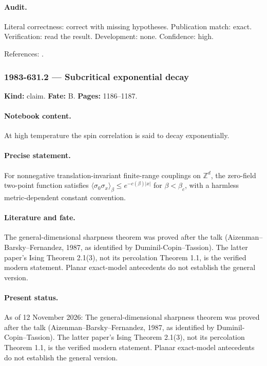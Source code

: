 \paragraph{Audit.} Literal correctness: correct with missing hypotheses. Publication match: exact. Verification: read the result. Development: none. Confidence: high.

\noindent References: \citep{onsager1944crystal}.\par

\subsubsection{1983-631.2 --- Subcritical exponential decay}

\label{item:1983-631.2}

\noindent\textbf{Kind:} claim. \textbf{Fate:} B. \textbf{Pages:} 1186--1187.\par

\paragraph{Notebook content.} At high temperature the spin correlation is said to decay exponentially.

\paragraph{Precise statement.} For nonnegative translation-invariant finite-range couplings on \(\mathbb Z^d\), the zero-field two-point function satisfies \(\langle\sigma_0\sigma_x\rangle_\beta\le e^{-c(\beta)|x|}\) for \(\beta<\beta_c\), with a harmless metric-dependent constant convention.

\paragraph{Literature and fate.} The general-dimensional sharpness theorem was proved after the talk (Aizenman--Barsky--Fernandez, 1987, as identified by Duminil-Copin--Tassion). The latter paper's Ising Theorem 2.1(3), not its percolation Theorem 1.1, is the verified modern statement. Planar exact-model antecedents do not establish the general version.

\paragraph{Present status.} As of 12 November 2026: The general-dimensional sharpness theorem was proved after the talk (Aizenman--Barsky--Fernandez, 1987, as identified by Duminil-Copin--Tassion). The latter paper's Ising Theorem 2.1(3), not its percolation Theorem 1.1, is the verified modern statement. Planar exact-model antecedents do not establish the general version.

